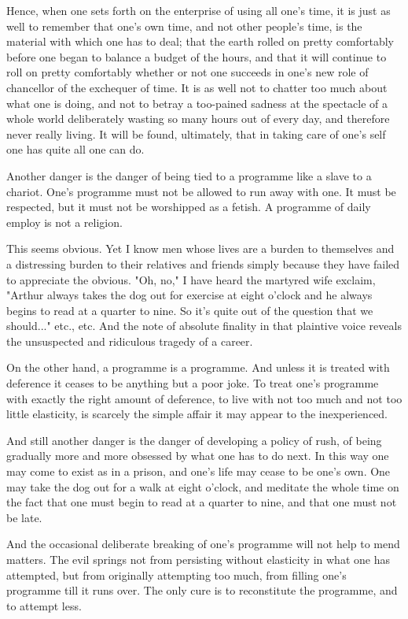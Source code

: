 Hence, when one sets forth on the enterprise of using all one's time,
it is just as well to remember that one's own time, and not other
people's time, is the material with which one has to deal; that the
earth rolled on pretty comfortably before one began to balance a budget
of the hours, and that it will continue to roll on pretty comfortably
whether or not one succeeds in one's new role of chancellor of the
exchequer of time.  It is as well not to chatter too much about what
one is doing, and not to betray a too-pained sadness at the spectacle
of a whole world deliberately wasting so many hours out of every day,
and therefore never really living.  It will be found, ultimately, that
in taking care of one's self one has quite all one can do.

Another danger is the danger of being tied to a programme like a slave
to a chariot.  One's programme must not be allowed to run away with
one. It must be respected, but it must not be worshipped as a fetish.
A programme of daily employ is not a religion.

This seems obvious.  Yet I know men whose lives are a burden to
themselves and a distressing burden to their relatives and friends
simply because they have failed to appreciate the obvious.  "Oh, no," I
have heard the martyred wife exclaim, "Arthur always takes the dog out
for exercise at eight o'clock and he always begins to read at a quarter
to nine.  So it's quite out of the question that we should..." etc.,
etc.  And the note of absolute finality in that plaintive voice reveals
the unsuspected and ridiculous tragedy of a career.

On the other hand, a programme is a programme.  And unless it is
treated with deference it ceases to be anything but a poor joke.  To
treat one's programme with exactly the right amount of deference, to
live with not too much and not too little elasticity, is scarcely the
simple affair it may appear to the inexperienced.

And still another danger is the danger of developing a policy of rush,
of being gradually more and more obsessed by what one has to do next.
In this way one may come to exist as in a prison, and one's life may
cease to be one's own.  One may take the dog out for a walk at eight
o'clock, and meditate the whole time on the fact that one must begin to
read at a quarter to nine, and that one must not be late.

And the occasional deliberate breaking of one's programme will not help
to mend matters.  The evil springs not from persisting without
elasticity in what one has attempted, but from originally attempting
too much, from filling one's programme till it runs over.  The only
cure is to reconstitute the programme, and to attempt less.

